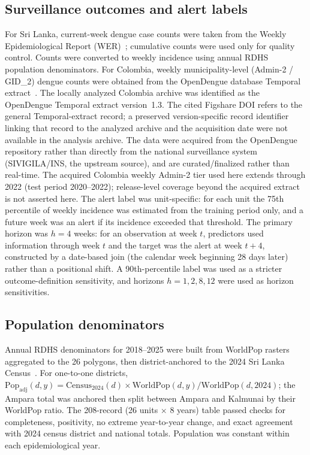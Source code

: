\documentclass[11pt,a4paper]{article}
\begin{document}
\subsection{Surveillance outcomes and alert labels}
For Sri Lanka, current-week dengue case counts were taken from the Weekly Epidemiological Report (WER)~\cite{SriLankaWER}; cumulative counts were used only for quality control. Counts were converted to weekly incidence using annual RDHS population denominators. For Colombia, weekly municipality-level (Admin-2 / GID\_2) dengue counts were obtained from the OpenDengue database Temporal extract~\cite{Clarke2024OpenDengue,OpenDengue2024}. The locally analyzed Colombia archive was identified as the OpenDengue Temporal extract version~1.3. The cited Figshare DOI refers to the general Temporal-extract record; a preserved version-specific record identifier linking that record to the analyzed archive and the acquisition date were not available in the analysis archive. The data were acquired from the OpenDengue repository rather than directly from the national surveillance system (SIVIGILA/INS, the upstream source), and are curated/finalized rather than real-time. The acquired Colombia weekly Admin-2 tier used here extends through 2022 (test period 2020--2022); release-level coverage beyond the acquired extract is not asserted here. The alert label was unit-specific: for each unit the 75th percentile of weekly incidence was estimated from the training period only, and a future week was an alert if its incidence exceeded that threshold. The primary horizon was $h=4$ weeks: for an observation at week $t$, predictors used information through week $t$ and the target was the alert at week $t+4$, constructed by a date-based join (the calendar week beginning 28 days later) rather than a positional shift. A 90th-percentile label was used as a stricter outcome-definition sensitivity, and horizons $h=1,2,8,12$ were used as horizon sensitivities.

\subsection{Population denominators}
Annual RDHS denominators for 2018--2025 were built from WorldPop rasters~\cite{Tatem2017,WorldPop2025} aggregated to the 26 polygons, then district-anchored to the 2024 Sri Lanka Census~\cite{SriLankaCensus2025}. For one-to-one districts, $\mathrm{Pop}_{\mathrm{adj}}(d,y)=\mathrm{Census}_{2024}(d)\times \mathrm{WorldPop}(d,y)/\mathrm{WorldPop}(d,2024)$; the Ampara total was anchored then split between Ampara and Kalmunai by their WorldPop ratio. The 208-record (26 units $\times$ 8 years) table passed checks for completeness, positivity, no extreme year-to-year change, and exact agreement with 2024 census district and national totals. Population was constant within each epidemiological year.
\end{document}
